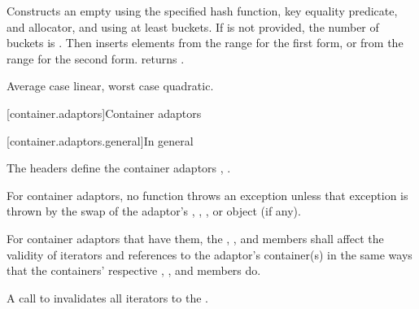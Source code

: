 \begin{itemdescr}
\pnum\effects
Constructs an empty  using the
specified hash function, key equality predicate, and allocator, and
using at least  buckets. If  is not
provided, the number of buckets is . Then
inserts elements from the range 
for the first form, or from the range
 for the second form.
 returns .

\pnum\complexity Average case linear, worst case quadratic.
\end{itemdescr}

[container.adaptors]{Container adaptors}

[container.adaptors.general]{In general}

\pnum
The headers   define the container adaptors
,  .

\pnum
For container adaptors, no  function throws an exception unless
that exception is thrown by the swap of the
adaptor's , , , or
 object (if any).

\begin{addedblock}
\pnum
For container adaptors that have them, the , ,
and  members shall affect the validity of iterators and
references to the adaptor's container(s) in the same ways that the containers'
respective , , and  members do.
\begin{example}
A call to  invalidates all iterators to
the .
\end{example}
\end{addedblock}

